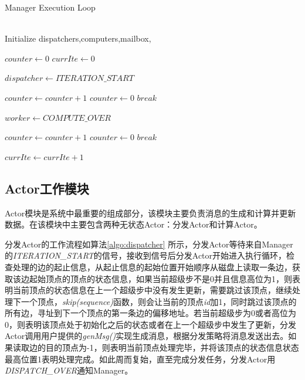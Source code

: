 \begin{algorithm}[htb!]
{
{

\renewcommand\baselinestretch{1.5}\selectfont %

\caption{Manager Execution Loop}
\label{algo:manager}
\begin{algorithmic}[1]
\REQUIRE ~\\
Initialize dispatchers,computers,mailbox, 

\STATE $counter \leftarrow 0$
\STATE $currIte \leftarrow 0$

\STATE $dispatcher \leftarrow ITERATION\_START$
\ENDFOR

\STATE $counter \leftarrow counter + 1$
\STATE $counter \leftarrow 0$
\STATE $break$
\ENDIF
\ENDWHILE

\STATE $worker \leftarrow COMPUTE\_OVER$
\ENDFOR

\STATE $counter \leftarrow counter + 1$
\STATE $counter \leftarrow 0$
\STATE $break$
\ENDIF
\ENDWHILE

\STATE $currIte \leftarrow currIte + 1$
\ENDWHILE
\end{algorithmic}
}
\par}
\end{algorithm}

\subsection{Actor工作模块}
Actor模块是系统中最重要的组成部分，该模块主要负责消息的生成和计算并更新数据。在该模块中主要包含两种无状态Actor：分发Actor和计算Actor。

分发Actor的工作流程如算法\ref{algo:dispatcher} 所示，分发Actor等待来自Manager的\textit{ITERATION\_START}的信号，接收到信号后分发Actor开始进入执行循环，检查处理的边的起止信息，从起止信息的起始位置开始顺序从磁盘上读取一条边，获取该边起始顶点的顶点的状态信息，如果当前超级步不是0并且信息高位为1，则表明当前顶点的状态信息在上一个超级步中没有发生更新，需要跳过该顶点，继续处理下一个顶点，\textit{skip(sequence)}函数，则会让当前的顶点\textit{id}加1，同时跳过该顶点的所有边，寻址到下一个顶点的第一条边的偏移地址。若当前超级步为0或者高位为0，则表明该顶点处于初始化之后的状态或者在上一个超级步中发生了更新，分发Actor调用用户提供的\textit{genMsg()}实现生成消息，根据分发策略将消息发送出去。如果读取边的目的顶点为-1，则表明当前顶点处理完毕，并将该顶点的状态信息状态最高位置1表明处理完成。如此周而复始，直至完成分发任务，分发Actor用\textit{DISPATCH\_OVER}通知Manager。

